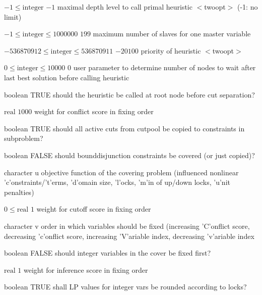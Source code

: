 %
{$-1\leq\textrm{integer}$}%
{$-1$}%
{maximal depth level to call primal heuristic $<$twoopt$>$ (-1: no limit)}%
{}

%
{$-1\leq\textrm{integer}\leq1000000$}%
{$199$}%
{maximum number of slaves for one master variable}%
{}

%
{$-536870912\leq\textrm{integer}\leq536870911$}%
{$-20100$}%
{priority of heuristic $<$twoopt$>$}%
{}

%
{$0\leq\textrm{integer}\leq10000$}%
{$0$}%
{user parameter to determine number of nodes to wait after last best solution before calling heuristic}%
{}

%
{boolean}%
{TRUE}%
{should the heuristic be called at root node before cut separation?}%
{}

%
{$\textrm{real}$}%
{$1000$}%
{weight for conflict score in fixing order}%
{}

%
{boolean}%
{TRUE}%
{should all active cuts from cutpool be copied to constraints in subproblem?}%
{}

%
{boolean}%
{FALSE}%
{should bounddisjunction constraints be covered (or just copied)?}%
{}

%
{character}%
{u}%
{objective function of the covering problem (influenced nonlinear 'c'onstraints/'t'erms, 'd'omain size, 'l'ocks, 'm'in of up/down locks, 'u'nit penalties)}%
{}

%
{$0\leq\textrm{real}$}%
{$1$}%
{weight for cutoff score in fixing order}%
{}

%
{character}%
{v}%
{order in which variables should be fixed (increasing 'C'onflict score, decreasing 'c'onflict score, increasing 'V'ariable index, decreasing 'v'ariable index}%
{}

%
{boolean}%
{FALSE}%
{should integer variables in the cover be fixed first?}%
{}

%
{$\textrm{real}$}%
{$1$}%
{weight for inference score in fixing order}%
{}

%
{boolean}%
{TRUE}%
{shall LP values for integer vars be rounded according to locks?}%
{}

